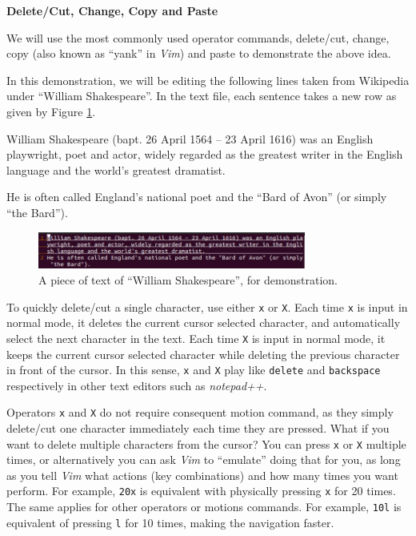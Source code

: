 \vspace{0.1in}
\noindent \textbf{Delete/Cut, Change, Copy and Paste}
\vspace{0.1in}

We will use the most commonly used operator commands, delete/cut, change, copy (also known as ``yank'' in \textit{Vim}) and paste to demonstrate the above idea.

In this demonstration, we will be editing the following lines taken from Wikipedia under ``William Shakespeare''. In the text file, each sentence takes a new row as given by Figure \ref{ch3fig:vimdemo1}.

\begin{shortbox}
William Shakespeare (bapt. 26 April 1564 – 23 April 1616) was an English playwright, poet and actor, widely regarded as the greatest writer in the English language and the world's greatest dramatist.

He is often called England's national poet and the ``Bard of Avon'' (or simply ``the Bard'').
\end{shortbox}

\begin{figure}
\centering
\includegraphics[width=250pt]{chapters/chapter3/figures/vimdemo1.png}
\caption{A piece of text of ``William Shakespeare'', for demonstration.} \label{ch3fig:vimdemo1}
\end{figure}

To quickly delete/cut a single character, use either \verb|x| or \verb|X|. Each time \verb|x| is input in normal mode, it deletes the current cursor selected character, and automatically select the next character in the text. Each time \verb|X| is input in normal mode, it keeps the current cursor selected character while deleting the previous character in front of the cursor. In this sense, \verb|x| and \verb|X| play like \verb|delete| and \verb|backspace| respectively in other text editors such as \textit{notepad++}.

Operators \verb|x| and \verb|X| do not require consequent motion command, as they simply delete/cut one character immediately each time they are pressed. What if you want to delete multiple characters from the cursor? You can press \verb|x| or \verb|X| multiple times, or alternatively you can ask \textit{Vim} to ``emulate'' doing that for you, as long as you tell \textit{Vim} what actions (key combinations) and how many times you want perform. For example, \verb|20x| is equivalent with physically pressing \verb|x| for 20 times. The same applies for other operators or motions commands. For example, \verb|10l| is equivalent of pressing \verb|l| for 10 times, making the navigation faster.

